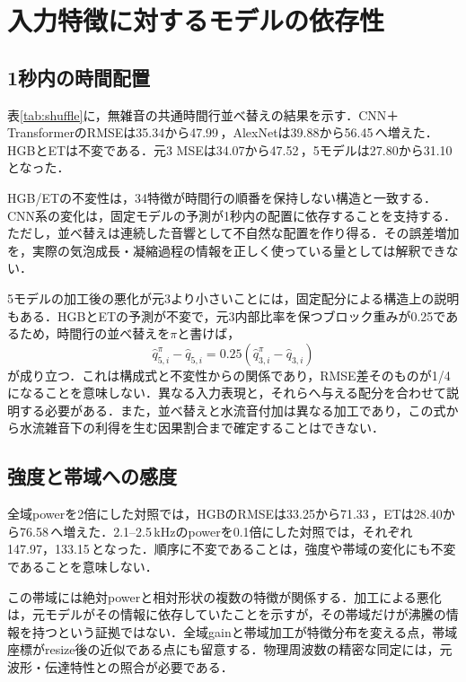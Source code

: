 \section{入力特徴に対するモデルの依存性}
\subsection{1秒内の時間配置}
表\ref{tab:shuffle}に，無雑音の共通時間行並べ替えの結果を示す．CNN＋TransformerのRMSEは35.34から47.99\,\kw{}，AlexNetは39.88から56.45\,\kw{}へ増えた．HGBとETは不変である．元3 MSEは34.07から47.52\,\kw{}，5モデルは27.80から31.10\,\kw{}となった．
\begin{table}[htbp]
\centering\small
\caption{固定モデルへの共通時間行並べ替え．全域RMSE [\kw{}]．元の10月7日対照を用いる．}
\label{tab:shuffle}

\end{table}

HGB/ETの不変性は，34特徴が時間行の順番を保持しない構造と一致する．CNN系の変化は，固定モデルの予測が1秒内の配置に依存することを支持する．ただし，並べ替えは連続した音響として不自然な配置を作り得る．その誤差増加を，実際の気泡成長・凝縮過程の情報を正しく使っている量としては解釈できない．

5モデルの加工後の悪化が元3より小さいことには，固定配分による構造上の説明もある．HGBとETの予測が不変で，元3内部比率を保つブロック重みが0.25であるため，時間行の並べ替えを$\pi$と書けば，
\begin{equation}\label{eq:shuffle_scaling}
 \hat q^{\pi}_{5,i}-\hat q_{5,i}
 =0.25\left(\hat q^{\pi}_{3,i}-\hat q_{3,i}\right)
\end{equation}
が成り立つ．これは構成式と不変性からの関係であり，RMSE差そのものが1/4になることを意味しない．異なる入力表現と，それらへ与える配分を合わせて説明する必要がある．また，並べ替えと水流音付加は異なる加工であり，この式から水流雑音下の利得を生む因果割合まで確定することはできない．

\subsection{強度と帯域への感度}
全域powerを2倍にした対照では，HGBのRMSEは33.25から71.33\,\kw{}，ETは28.40から76.58\,\kw{}へ増えた．2.1--2.5\,kHzのpowerを0.1倍にした対照では，それぞれ147.97，133.15\,\kw{}となった\cite{localLink}．順序に不変であることは，強度や帯域の変化にも不変であることを意味しない．

この帯域には絶対powerと相対形状の複数の特徴が関係する．加工による悪化は，元モデルがその情報に依存していたことを示すが，その帯域だけが沸騰の情報を持つという証拠ではない．全域gainと帯域加工が特徴分布を変える点，帯域座標がresize後の近似である点にも留意する．物理周波数の精密な同定には，元波形・伝達特性との照合が必要である．


